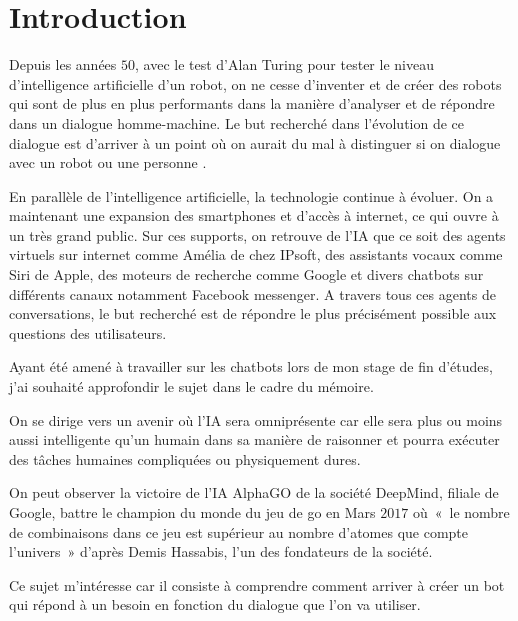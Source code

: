 \chapter*{Introduction}

Depuis les années $50$, avec le test d’Alan Turing pour tester le niveau d’intelligence artificielle d’un robot, on ne cesse d’inventer et de créer des robots qui sont de plus en plus performants dans la manière d’analyser et de répondre dans un dialogue homme-machine. Le but recherché dans l’évolution de ce dialogue est d’arriver à un point où on aurait du mal à distinguer si on dialogue avec un robot ou une personne \cite{ref1}.
\vspace{1em}

	En parallèle de l’intelligence artificielle, la technologie continue à évoluer. On a maintenant une expansion des smartphones et d’accès à internet, ce qui ouvre à un très grand public. Sur ces supports, on retrouve de l’IA que ce soit des agents virtuels sur internet comme Amélia de chez IPsoft, des assistants vocaux comme Siri de Apple, des moteurs de recherche comme Google et divers chatbots sur différents canaux notamment Facebook messenger.
	A travers tous ces agents de conversations, le but recherché est de répondre le plus précisément possible aux questions des utilisateurs.
\vspace{1em}

	Ayant été amené à travailler sur les chatbots lors de mon stage de fin d’études, j’ai souhaité approfondir le sujet dans le cadre du mémoire. 
	\vspace{1em}

	On se dirige vers un avenir où l’IA sera omniprésente car elle sera plus ou moins aussi intelligente qu’un humain dans sa manière de raisonner et pourra exécuter des tâches humaines compliquées ou physiquement dures.
	\vspace{1em}
	
	On peut observer la victoire de l’IA AlphaGO de la société DeepMind, filiale de Google, battre le champion du monde du jeu de go en Mars $2017$ où « le nombre de combinaisons dans ce jeu est supérieur au nombre d’atomes que compte l’univers » d’après Demis Hassabis, l’un des fondateurs de la société.
	\vspace{1em}
	
	Ce sujet m’intéresse car il consiste à comprendre comment arriver à créer un bot qui répond à un besoin en fonction du dialogue que l’on va utiliser.
	\vspace{1em}

